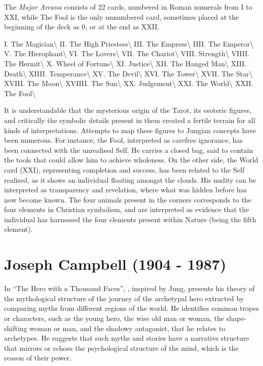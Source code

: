 \documentclass[]{book}
\begin{document}
The \emph{Major Arcana} consists of 22 cards, numbered in Roman numerals from I to XXI, while The Fool is the only unnumbered card, sometimes placed at the beginning of the deck as 0, or at the end as XXII.

I. The Magician\textbackslash{}
II. The High Priestess\textbackslash{}
III. The Empress\textbackslash{}
IIII. The Emperor\textbackslash{}
V. The Hierophant\textbackslash{}
VI. The Lovers\textbackslash{}
VII. The Chariot\textbackslash{}
VIII. Strength\textbackslash{}
VIIII. The Hermit\textbackslash{}
X. Wheel of Fortune\textbackslash{}
XI. Justice\textbackslash{}
XII. The Hanged Man\textbackslash{}
XIII. Death\textbackslash{}
XIIII. Temperance\textbackslash{}
XV. The Devil\textbackslash{}
XVI. The Tower\textbackslash{}
XVII. The Star\textbackslash{}
XVIII. The Moon\textbackslash{}
XVIIII. The Sun\textbackslash{}
XX. Judgement\textbackslash{}
XXI. The World\textbackslash{}
XXII. The Fool\textbackslash{}

It is understandable that the mysterious origin of the Tarot, its esoteric figures, and critically the symbolic details present in them created a fertile terrain for all kinds of interpretations. Attempts to map these figures to Jungian concepts have been numerous. For instance, the Fool, interpreted as carefree ignorance, has been connected with the unrealised Self. He carries a closed bag, said to contain the tools that could allow him to achieve wholeness. On the other side, the World card (XXI), representing completion and success, has been related to the Self realised, as it shows an individual floating amongst the clouds. His nudity can be interpreted as transparency and revelation, where what was hidden before has now become known. The four animals present in the corners corresponds to the four elements in Christian symbolism, and are interpreted as evidence that the individual has harnessed the four elements present within Nature (being the fifth element).

\hypertarget{joseph-campbell-1904---1987}{%
\section{Joseph Campbell (1904 - 1987)}\label{joseph-campbell-1904---1987}}

In ``The Hero with a Thousand Faces'', \citet{campbell1949hero}, inspired by Jung, presents his theory of the mythological structure of the journey of the archetypal hero extracted by comparing myths from different regions of the world. He identifies common tropes or characters, such as the young hero, the wise old man or woman, the shape-shifting woman or man, and the shadowy antagonist, that he relates to archetypes. He suggests that such myths and stories have a narrative structure that mirrors or echoes the psychological structure of the mind, which is the reason of their power.
\end{document}
